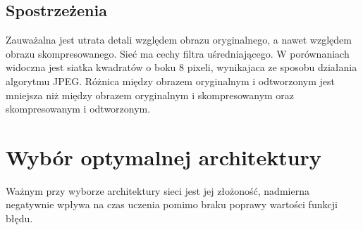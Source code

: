 \documentclass[a4paper,11pt]{article}
\begin{document}
\subsection{Spostrzeżenia}
Zauważalna jest utrata detali względem obrazu oryginalnego, a nawet względem obrazu skompresowanego. Sieć ma cechy filtra uśredniającego.
W porównaniach widoczna jest siatka kwadratów o boku 8 pixeli, wynikajaca ze sposobu działania algorytmu JPEG.
Różnica między obrazem oryginalnym i odtworzonym jest mniejsza niż między obrazem oryginalnym i skompresowanym oraz skompresowanym i odtworzonym.

\section{Wybór optymalnej architektury}
Ważnym przy wyborze architektury sieci jest jej złożoność, nadmierna negatywnie wpływa na czas uczenia pomimo braku poprawy wartości funkcji błędu.
\end{document}
